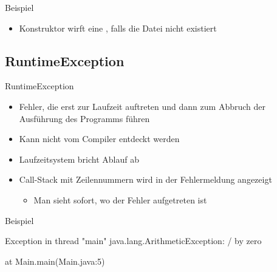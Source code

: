 \documentclass{../tuda-beamer}
\begin{document}
    \begin{frame}{Beispiel}
        \begin{itemize}
            \item {} Konstruktor wirft eine , falls
            die Datei nicht existiert
        \end{itemize}

        
    \end{frame}


    \subsection{RuntimeException}
    \label{subsec:runtime-exception}
    \begin{frame}[c]{RuntimeException}
        \begin{itemize}
            \item Fehler, die erst zur Laufzeit auftreten und dann zum Abbruch der Ausführung des
            Programms führen
            \item Kann nicht vom Compiler entdeckt werden
            \item Laufzeitsystem bricht Ablauf ab
            \item Call-Stack mit Zeilennummern wird in der Fehlermeldung angezeigt
            \begin{itemize}
                \item Man sieht sofort, wo der Fehler aufgetreten ist
            \end{itemize}
        \end{itemize}
    \end{frame}

    \begin{frame}[c]{Beispiel}
        

        \begin{tcolorbox}
            \textcolor{TUDa-9c}{Exception in thread "main"{} java.lang.ArithmeticException: / by
            zero}

            \hspace{1cm}\textcolor{TUDa-9c}{at Main.main(Main.java:5)}
        \end{tcolorbox}
    \end{frame}
\end{document}
